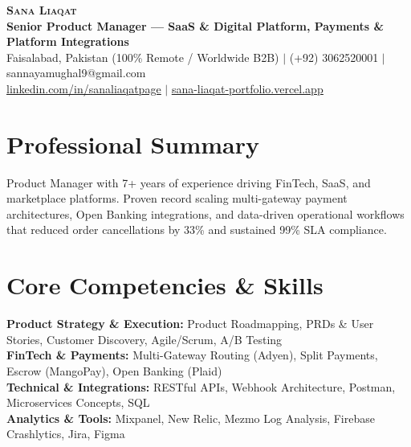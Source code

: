 \documentclass[letterpaper,10pt]{article}
\begin{document}
\begin{center}
    \textbf{\Huge \scshape Sana Liaqat} \\ \vspace{2pt}
    \textbf{\large Senior Product Manager — SaaS \& Digital Platform, Payments \& Platform Integrations} \\ \vspace{3pt}
    \small Faisalabad, Pakistan (100\% Remote / Worldwide B2B) $|$ (+92) 3062520001 $|$ sannayamughal9@gmail.com \\ \vspace{1pt} 
    \small \href{https://www.linkedin.com/in/sanaliaqatpage/}{\underline{linkedin.com/in/sanaliaqatpage}} $|$ \href{https://sana-liaqat-portfolio.vercel.app/}{\underline{sana-liaqat-portfolio.vercel.app}}
\end{center}

\section{Professional Summary}
\small{
Product Manager with 7+ years of experience driving FinTech, SaaS, and marketplace platforms. Proven record scaling multi-gateway payment architectures, Open Banking integrations, and data-driven operational workflows that reduced order cancellations by 33\% and sustained 99\% SLA compliance.
}

\section{Core Competencies \& Skills}
\begin{itemize}[leftmargin=0.15in, label={}]
    \small{\item{
     \textbf{Product Strategy \& Execution:} Product Roadmapping, PRDs \& User Stories, Customer Discovery, Agile/Scrum, A/B Testing \\
     \textbf{FinTech \& Payments:} Multi-Gateway Routing (Adyen), Split Payments, Escrow (MangoPay), Open Banking (Plaid) \\
     \textbf{Technical \& Integrations:} RESTful APIs, Webhook Architecture, Postman, Microservices Concepts, SQL \\
     \textbf{Analytics \& Tools:} Mixpanel, New Relic, Mezmo Log Analysis, Firebase Crashlytics, Jira, Figma
    }}
\end{itemize}

\end{document}
